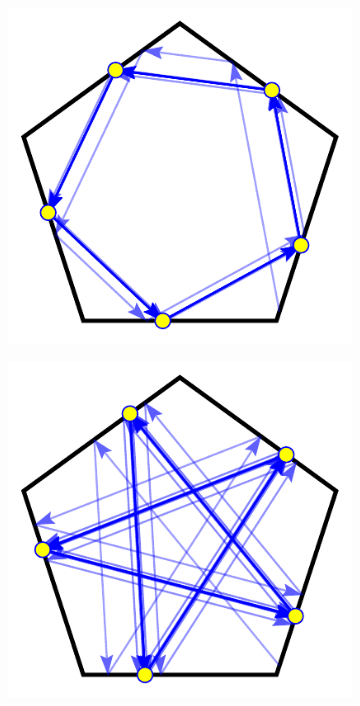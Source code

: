 \documentclass[letterpaper, 10 pt, conference]{ieeeconf}  %
\begin{document}
\begin{figure}[tp]
\begin{subfigure}{.25\textwidth}
\centering
\includegraphics[width=0.8\linewidth]{../figs/pent_05rad.pdf}
\end{subfigure}%
\begin{subfigure}{0.25\textwidth}
\includegraphics[width=0.8\linewidth]{../figs/pent_1rad.pdf}
\end{subfigure}
\begin{subfigure}{0.25\textwidth}

\end{subfigure}
\end{figure}
\end{document}
